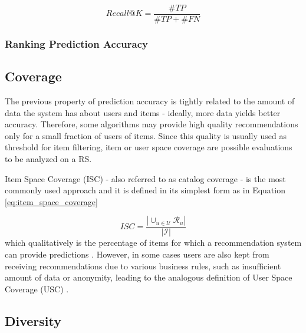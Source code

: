 \begin{equation}
\label{eq:recall}
Recall@K = \frac{\#TP}{\#TP + \#FN}
\end{equation}

\subsubsection{Ranking Prediction Accuracy}


\subsection{Coverage}

The previous property of prediction accuracy is tightly related to the amount of data the system has about users and items - ideally, more data yields better accuracy. Therefore, some algorithms may provide high quality recommendations only for a small fraction of users of items. Since this quality is usually used as threshold for item filtering, item or user space coverage are possible evaluations to be analyzed on a RS. 

Item Space Coverage (ISC)  - also referred to as catalog coverage - is the most commonly used approach and it is defined in its simplest form as in Equation \ref{eq:item_space_coverage}

\begin{equation}
    \label{eq:item_space_coverage}
    ISC = \frac{|\cup_{u \in \mathcal{U}} \mathcal{R}_u|}{|\mathcal{I}|}
\end{equation} which qualitatively is the percentage of items for which a recommendation system can provide predictions \cite{1999AlgorithmicFramework}. However, in some cases users are also kept from receiving recommendations due to various business rules, such as insufficient amount of data or anonymity, leading to the analogous definition of User Space Coverage (USC)  \cite{2011EvaluatingRS}.





\subsection{Diversity}


